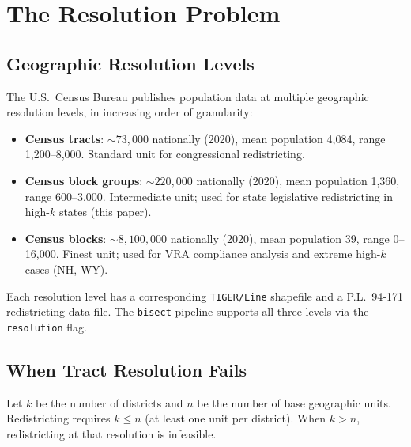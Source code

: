 \section{The Resolution Problem}
\label{sec:problem}

\subsection{Geographic Resolution Levels}
\label{sec:problem:levels}

The U.S.\ Census Bureau publishes population data at multiple geographic
resolution levels, in increasing order of granularity:
\begin{itemize}
  \item \textbf{Census tracts}: $\sim\!73,000$ nationally (2020), mean population
    4,084, range 1,200--8,000. Standard unit for congressional redistricting.
  \item \textbf{Census block groups}: $\sim\!220,000$ nationally (2020),
    mean population 1,360, range 600--3,000. Intermediate unit; used for
    state legislative redistricting in high-$k$ states (this paper).
  \item \textbf{Census blocks}: $\sim\!8,100,000$ nationally (2020), mean
    population 39, range 0--16,000. Finest unit; used for VRA compliance
    analysis and extreme high-$k$ cases (NH, WY).
\end{itemize}

Each resolution level has a corresponding \texttt{TIGER/Line} shapefile and
a P.L.~94-171 redistricting data file. The \texttt{bisect} pipeline supports
all three levels via the \texttt{--resolution} flag.

\subsection{When Tract Resolution Fails}
\label{sec:problem:failure}

Let $k$ be the number of districts and $n$ be the number of base geographic
units. Redistricting requires $k \leq n$ (at least one unit per district).
When $k > n$, redistricting at that resolution is infeasible.

